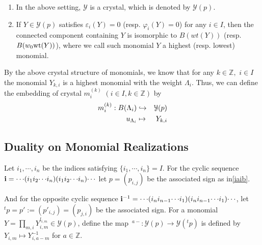 \begin{thm}[\cite{K7,Nj}]
\begin{enumerate}
\item
In the above setting, ${{\mathcal Y}}$ is a crystal, which is denoted by ${{\mathcal Y}}(p)$.
\item
If $Y\in{{\mathcal Y}}(p)$ satisfies ${\varepsilon}_i(Y)=0$ (resp. ${\varphi}_i(Y)=0$) for any $i\in I$, 
then the connected component containing $Y$ is isomorphic to
$B(wt(Y))$ (resp. $B(w_0{{\rm wt}}(Y))$), 
where we call such monomial $Y$ a highest (resp. lowest) monomial.
\end{enumerate}
\end{thm}
By the above crystal structure of monomials, we know that 
for any $k\in {\mathbb Z},\,\,i\in I$
the monomial $Y_{k,i}$ is a highest monomial with the weight ${\Lambda}_i$. 
Thus, we can define the embedding of crystal 
${m^{(k)}_{i}}$ $(i\in I,k\in{\mathbb Z})$ by 
\begin{eqnarray}
 {m^{(k)}_{i}}:B({\Lambda}_i)&\hookrightarrow& {{\mathcal Y}}(p)
\label{embed-mki}\\
u_{{\Lambda}_i}&\mapsto& Y_{k,i} {\nonumber}
\end{eqnarray}

\subsection{Duality on Monomial Realizations}

Let $i_1,{\cdots},i_n$ be the indices satisfying $\{i_1,{\cdots},i_n\}=I$.
For the cyclic sequence 
${\bf i}={\cdots}(i_1i_2{\cdots} i_n)(i_1i_2{\cdots} i_n){\cdots}$
let $p=(p_{i,j})$ be the associated sign as in\eqref{iaib}.

And for the opposite cyclic sequence
${\bf i}^{-1}={\cdots}(i_ni_{n-1}{\cdots} i_1)(i_ni_{n-1}{\cdots} i_1){\cdots}$, 
let ${}^tp=p':=(p'_{i,j})=(p_{j,i})$  be the associated sign.
For a monomial $Y=\prod_{m,i}Y_{i,m}^{l_{i,m}}\in{{\mathcal Y}}(p)$, define the 
map ${\,}^{a-}:{{\mathcal Y}}(p)\to {{\mathcal Y}}({}^tp)$ is defined by 
$Y_{i,m}\mapsto Y_{i,a-m}^{-1}$ for $a\in {\mathbb Z}$.

